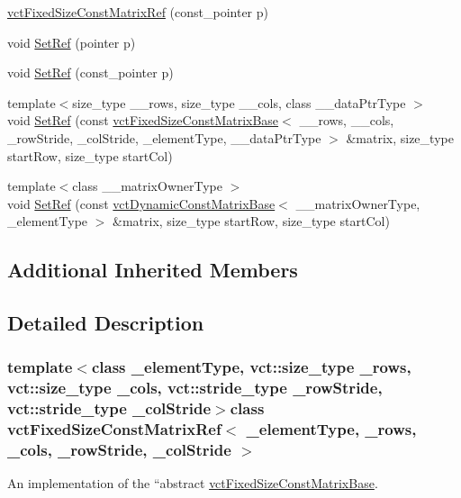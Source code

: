 \begin{DoxyCompactItemize}
\hyperlink{classvct_fixed_size_const_matrix_ref_a1b7ffdc29bd51d4146d80af23d2c22cc}{vct\+Fixed\+Size\+Const\+Matrix\+Ref} (const\+\_\+pointer p)
\item 
void \hyperlink{classvct_fixed_size_const_matrix_ref_adb19b8fe373b1a69924d09c169c3a36c}{Set\+Ref} (pointer p)
\item 
void \hyperlink{classvct_fixed_size_const_matrix_ref_a4710f4f6b69a83049cf519ad317def6d}{Set\+Ref} (const\+\_\+pointer p)
\item 
{\footnotesize template$<$size\+\_\+type \+\_\+\+\_\+rows, size\+\_\+type \+\_\+\+\_\+cols, class \+\_\+\+\_\+data\+Ptr\+Type $>$ }\\void \hyperlink{classvct_fixed_size_const_matrix_ref_a82664174d50cc4b0659c314f8b307be7}{Set\+Ref} (const \hyperlink{classvct_fixed_size_const_matrix_base}{vct\+Fixed\+Size\+Const\+Matrix\+Base}$<$ \+\_\+\+\_\+rows, \+\_\+\+\_\+cols, \+\_\+row\+Stride, \+\_\+col\+Stride, \+\_\+element\+Type, \+\_\+\+\_\+data\+Ptr\+Type $>$ \&matrix, size\+\_\+type start\+Row, size\+\_\+type start\+Col)
\item 
{\footnotesize template$<$class \+\_\+\+\_\+matrix\+Owner\+Type $>$ }\\void \hyperlink{classvct_fixed_size_const_matrix_ref_a3f94703b589c4c419a49e46b77b19943}{Set\+Ref} (const \hyperlink{classvct_dynamic_const_matrix_base}{vct\+Dynamic\+Const\+Matrix\+Base}$<$ \+\_\+\+\_\+matrix\+Owner\+Type, \+\_\+element\+Type $>$ \&matrix, size\+\_\+type start\+Row, size\+\_\+type start\+Col)
\end{DoxyCompactItemize}
\subsection*{Additional Inherited Members}


\subsection{Detailed Description}
\subsubsection*{template$<$class \+\_\+element\+Type, vct\+::size\+\_\+type \+\_\+rows, vct\+::size\+\_\+type \+\_\+cols, vct\+::stride\+\_\+type \+\_\+row\+Stride, vct\+::stride\+\_\+type \+\_\+col\+Stride$>$class vct\+Fixed\+Size\+Const\+Matrix\+Ref$<$ \+\_\+element\+Type, \+\_\+rows, \+\_\+cols, \+\_\+row\+Stride, \+\_\+col\+Stride $>$}

An implementation of the ``abstract\textquotesingle{}\textquotesingle{} \hyperlink{classvct_fixed_size_const_matrix_base}{vct\+Fixed\+Size\+Const\+Matrix\+Base}. 

